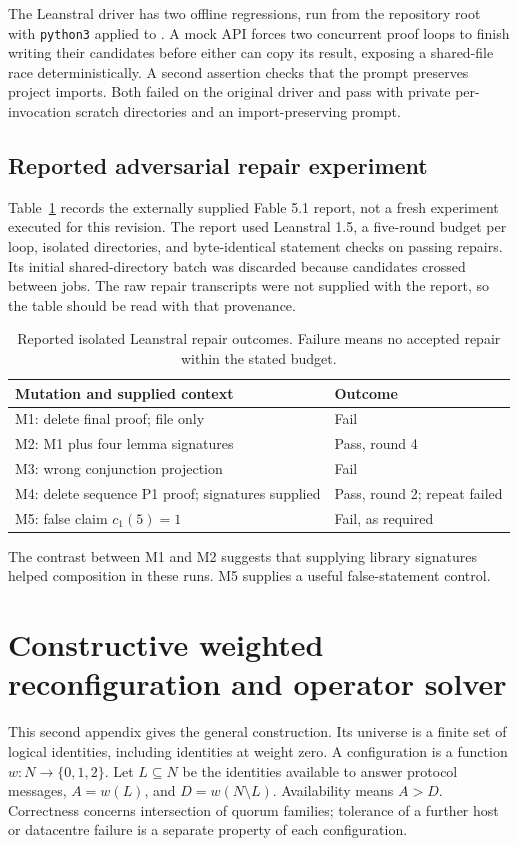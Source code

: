 \documentclass[10pt,journal,letterpaper]{IEEEtran}
\newcommand{\code}[1]{\texttt{#1}}
\begin{document}
The Leanstral driver has two offline regressions, run from the repository root with \code{python3} applied to . A mock API forces two concurrent proof loops to finish writing their candidates before either can copy its result, exposing a shared-file race deterministically. A second assertion checks that the prompt preserves project imports. Both failed on the original driver and pass with private per-invocation scratch directories and an import-preserving prompt.

\subsection{Reported adversarial repair experiment}
Table~\ref{tab:repair} records the externally supplied Fable 5.1 report, not a fresh experiment executed for this revision. The report used Leanstral 1.5, a five-round budget per loop, isolated directories, and byte-identical statement checks on passing repairs. Its initial shared-directory batch was discarded because candidates crossed between jobs. The raw repair transcripts were not supplied with the report, so the table should be read with that provenance.
\begin{table}[t]
\centering
\caption{Reported isolated Leanstral repair outcomes. Failure means no accepted repair within the stated budget.}
\label{tab:repair}
\small
\begin{tabular}{p{}p{}}
\toprule
Mutation and supplied context & Outcome\\
\midrule
M1: delete final proof; file only & Fail\\
M2: M1 plus four lemma signatures & Pass, round 4\\
M3: wrong conjunction projection & Fail\\
M4: delete sequence P1 proof; signatures supplied & Pass, round 2; repeat failed\\
M5: false claim $c_1(5)=1$ & Fail, as required\\
\bottomrule
\end{tabular}
\end{table}
The contrast between M1 and M2 suggests that supplying library signatures helped composition in these runs. M5 supplies a useful false-statement control. 


\section{Constructive weighted reconfiguration and operator solver}\label{app:solver}
This second appendix gives the general construction. Its universe is a finite set of logical identities, including identities at weight zero. A configuration is a function $w:N\to\{0,1,2\}$. Let $L\subseteq N$ be the identities available to answer protocol messages, $A=w(L)$, and $D=w(N\setminus L)$. Availability means $A>D$. Correctness concerns intersection of quorum families; tolerance of a further host or datacentre failure is a separate property of each configuration.
\end{document}
